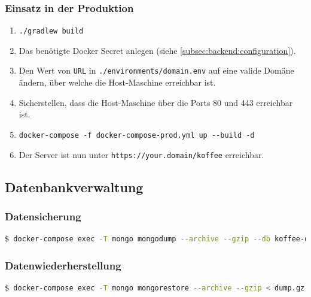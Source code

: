 \documentclass[a4paper, 11pt]{article}
\begin{document}
\subsubsection*{Einsatz in der Produktion}
\label{subsubsec:attachments:instructions:production}
\begin{enumerate}
	\item \verb|./gradlew build|
	\item Das benötigte Docker Secret anlegen (siehe \autoref{subsec:backend:configuration}).
	\item Den Wert von \verb|URL| in \verb|./environments/domain.env| auf eine valide Domäne ändern, über welche die Host-Maschine erreichbar ist.
	\item Sicherstellen, dass die Host-Maschine über die Ports 80 und 443 erreichbar ist.
	\item \verb|docker-compose -f docker-compose-prod.yml up --build -d|
	\item Der Server ist nun unter \verb|https://your.domain/koffee| erreichbar.
\end{enumerate}

\subsection*{Datenbankverwaltung}
\label{subsec:attachments:database}

\subsubsection*{Datensicherung}
\label{subsubsec:attachments:database:backup}
\begin{lstlisting}[language=Bash, breaklines=true]
$ docker-compose exec -T mongo mongodump --archive --gzip --db koffee-database > dump.gz
\end{lstlisting}

\subsubsection*{Datenwiederherstellung}
\label{subsubsec:attachments:database:restore}
\begin{lstlisting}[language=Bash, breaklines=true]
$ docker-compose exec -T mongo mongorestore --archive --gzip < dump.gz
\end{lstlisting}
\end{document}
